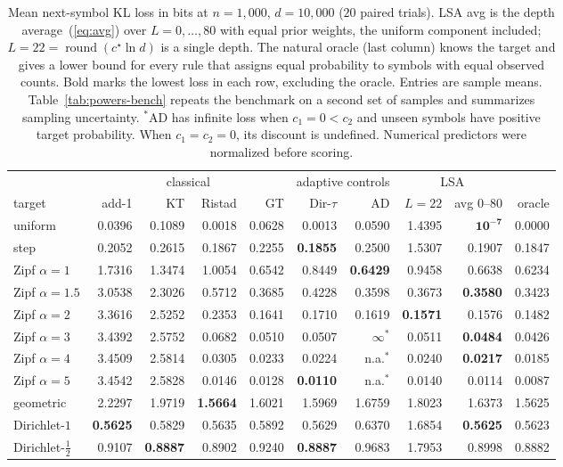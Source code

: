 \documentclass[anon]{alt2027}
\newcommand{\cstar}{c^{\star}}
\renewcommand{\eqref}[1]{(\ref{#1})}
\begin{document}
\begin{table}[!htbp]
\centering
\caption{Mean next-symbol KL loss in bits at $n=1{,}000$, $d=10{,}000$ ($20$ paired trials). LSA avg is the depth average~\eqref{eq:avg} over $L=0,\dots,80$ with equal prior weights, the uniform component included; $L=22=\operatorname{round}(\cstar\ln d)$ is a single depth. The natural oracle (last column) knows the target and gives a lower bound for every rule that assigns equal probability to symbols with equal observed counts. Bold marks the lowest loss in each row, excluding the oracle. Entries are sample means. Table~\ref{tab:powers-bench} repeats the benchmark on a second set of samples and summarizes sampling uncertainty. $^{*}$AD has infinite loss when $c_1=0<c_2$ and unseen symbols have positive target probability. When $c_1=c_2=0$, its discount is undefined. Numerical predictors were normalized before scoring.}

\label{tab:bench}
\footnotesize\setlength{\tabcolsep}{3.2pt}
\begin{tabular}{lrrrr|rr|rr|r}
\toprule
& \multicolumn{4}{c|}{classical} & \multicolumn{2}{c|}{adaptive controls} & \multicolumn{2}{c|}{LSA} & \\
target & add-1 & KT & Ristad & GT & Dir-$\tau$ & AD & $L=22$ & avg $0$--$80$ & oracle\\
\midrule
uniform & 0.0396 & 0.1089 & 0.0018 & 0.0628 & 0.0013 & 0.0590 & 1.4395 & $\mathbf{10^{-7}}$ & 0.0000\\
step & 0.2052 & 0.2615 & 0.1867 & 0.2255 & \textbf{0.1855} & 0.2500 & 1.5307 & 0.1907 & 0.1847\\
Zipf $\alpha=1$ & 1.7316 & 1.3474 & 1.0054 & 0.6542 & 0.8449 & \textbf{0.6429} & 0.9458 & 0.6638 & 0.6234\\
Zipf $\alpha=1.5$ & 3.0538 & 2.3026 & 0.5712 & 0.3685 & 0.4228 & 0.3598 & 0.3673 & \textbf{0.3580} & 0.3423\\
Zipf $\alpha=2$ & 3.3616 & 2.5252 & 0.2353 & 0.1641 & 0.1710 & 0.1619 & \textbf{0.1571} & 0.1576 & 0.1482\\
Zipf $\alpha=3$ & 3.4392 & 2.5752 & 0.0682 & 0.0510 & 0.0507 & $\infty^{*}$ & 0.0511 & \textbf{0.0484} & 0.0426\\
Zipf $\alpha=4$ & 3.4509 & 2.5814 & 0.0305 & 0.0233 & 0.0224 & n.a.$^{*}$ & 0.0240 & \textbf{0.0217} & 0.0185\\
Zipf $\alpha=5$ & 3.4542 & 2.5828 & 0.0146 & 0.0128 & \textbf{0.0110} & n.a.$^{*}$ & 0.0140 & 0.0114 & 0.0087\\
geometric & 2.2297 & 1.9719 & \textbf{1.5664} & 1.6021 & 1.5969 & 1.6759 & 1.8023 & 1.6373 & 1.5625\\
Dirichlet-$1$ & \textbf{0.5625} & 0.5829 & 0.5635 & 0.5892 & 0.5629 & 0.6370 & 1.6854 & \textbf{0.5625} & 0.5623\\
Dirichlet-$\frac12$ & 0.9107 & \textbf{0.8887} & 0.8902 & 0.9240 & \textbf{0.8887} & 0.9683 & 1.7953 & 0.8998 & 0.8882\\
\bottomrule
\end{tabular}
\end{table}
\end{document}
